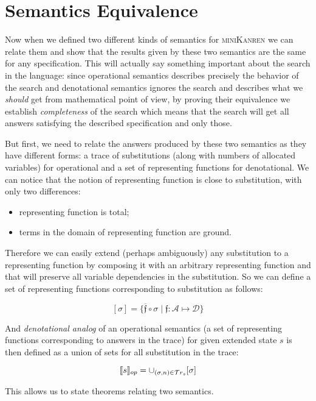 \section{Semantics Equivalence}
\label{equivalence}

Now when we defined two different kinds of semantics for \textsc{miniKanren} we can relate them and show that the results given by these two semantics are the same for any specification.
This will actually say something important about the search in the language: since operational semantics describes precisely the behavior of the search and denotational semantics
ignores the search and describes what we \emph{should} get from mathematical point of view, by proving their equivalence we establish \emph{completeness} of the search which
means that the search will get all answers satisfying the described specification and only those.

But first, we need to relate the answers produced by these two semantics as they have different forms: a trace of substitutions (along with numbers of allocated variables)
for operational and a set of representing functions for denotational. We can notice that the notion of representing function is close to substitution, with only two differences:

\begin{itemize}
\item representing function is total;
\item terms in the domain of representing function are ground.
\end{itemize}

Therefore we can easily extend (perhaps ambiguously) any substitution to a representing function by composing it with an arbitrary representing function and that will
preserve all variable dependencies in the substitution. So we can define a set of representing functions corresponding to substitution as follows:

\[
[\sigma] = \{\overline{\mathfrak f} \circ \sigma \mid \mathfrak{f}:\mathcal{A}\mapsto\mathcal{D}\}
\]

And \emph{denotational analog} of an operational semantics (a set of representing functions corresponding to answers in the trace) for given extended state $s$ is
then defined as a union of sets for all substitution in the trace:

\[
\llbracket{s}\rrbracket_{op} = \cup_{(\sigma, n) \in \mathcal{T}r_{s}} [\sigma]
\]

This allows us to state theorems relating two semantics.

